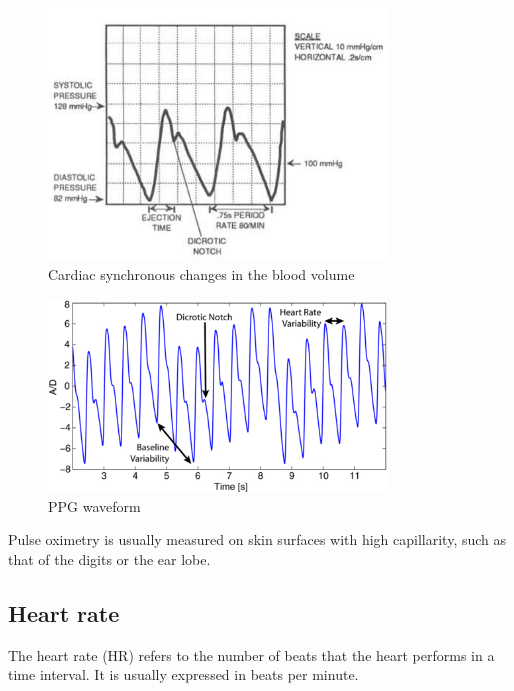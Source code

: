 \begin{figure}[!ht]
\centering
\includegraphics[width=0.8\textwidth]{images/BloodPressureWaveform.jpg}
\caption{Cardiac synchronous changes in the blood volume}
\label{fig:bloodpressure}
\end{figure}


\begin{figure}[!ht]
\centering
\includegraphics[width=0.8\textwidth]{images/PPGnaturalVariations.jpg}
\caption{PPG waveform}
\label{fig:PPGnatvars}
\end{figure}



Pulse oximetry is usually measured on skin surfaces with high
capillarity, such as that of the digits or the ear lobe.


\subsection{Heart rate}
\label{subsec:setup:phys-signals:hr}

The heart rate (HR) refers to the number of beats that the heart
performs in a time interval. It is usually expressed in beats per
minute.

